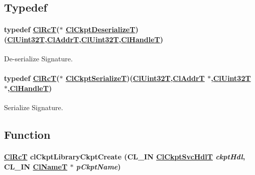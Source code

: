 \subsection{Typedef }
\hypertarget{group__group10_ga1}{
\paragraph[ClCkptDeserializeT]{\setlength{\rightskip}{0pt plus 5cm}typedef \hyperlink{group__group2_ga18}{Cl\-Rc\-T}($\ast$ \hyperlink{group__group10_ga1}{Cl\-Ckpt\-Deserialize\-T})(\hyperlink{group__group2_ga1}{Cl\-Uint32T},\hyperlink{group__group2_ga16}{Cl\-Addr\-T},\hyperlink{group__group2_ga1}{Cl\-Uint32T},\hyperlink{group__group2_ga10}{Cl\-Handle\-T})}\hfill}
\label{group__group10_ga1}


De-serialize Signature. \hypertarget{group__group10_ga0}{
\paragraph[ClCkptSerializeT]{\setlength{\rightskip}{0pt plus 5cm}typedef \hyperlink{group__group2_ga18}{Cl\-Rc\-T}($\ast$ \hyperlink{group__group10_ga0}{Cl\-Ckpt\-Serialize\-T})(\hyperlink{group__group2_ga1}{Cl\-Uint32T},\hyperlink{group__group2_ga16}{Cl\-Addr\-T} $\ast$,\hyperlink{group__group2_ga1}{Cl\-Uint32T} $\ast$,\hyperlink{group__group2_ga10}{Cl\-Handle\-T})}\hfill}
\label{group__group10_ga0}


Serialize Signature. 

\subsection{Function }
\hypertarget{group__group10_ga4}{
\paragraph[clCkptLibraryCkptCreate]{\setlength{\rightskip}{0pt plus 5cm}\hyperlink{group__group2_ga18}{Cl\-Rc\-T} cl\-Ckpt\-Library\-Ckpt\-Create (CL\_\-IN \hyperlink{cl_ckpt_api_8h_a12}{Cl\-Ckpt\-Svc\-Hdl\-T} {\em ckpt\-Hdl}, CL\_\-IN \hyperlink{struct_cl_name_t}{Cl\-Name\-T} $\ast$ {\em p\-Ckpt\-Name})}\hfill}
\label{group__group10_ga4}


